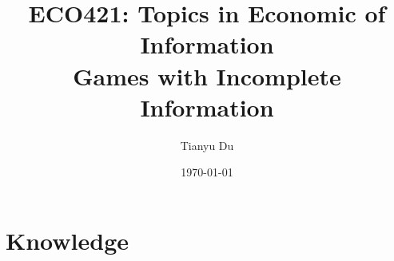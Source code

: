 \documentclass{article}
\title{ECO421: Topics in Economic of Information \\ \large Games with Incomplete Information}
\date{\today}
\author{Tianyu Du}
\begin{document}
    \maketitle
    \tableofcontents
    \newpage
    
    \section{Knowledge}
    \begin{definition}
    	
    \end{definition}
    
\end{document}
